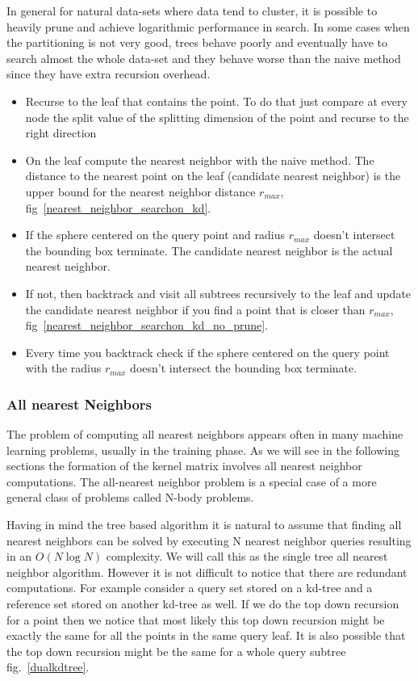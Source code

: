 \documentclass[12pt,letterpaper,doublespaced,ETD,dvips,proposal]{gtthesis}
\begin{document}
\begin{Body}
 In general for natural data-sets where data tend to cluster, it is
 possible to heavily prune and achieve logarithmic performance in
 search. In some cases when the partitioning is not very good, trees
 behave poorly and eventually have to search almost the whole
 data-set and they behave worse than the naive method since they
 have extra recursion overhead.

\begin{itemize}
   \item Recurse to the leaf that contains the point. To do that
   just compare at every node the split value of the splitting
   dimension of the point and recurse to the right direction
   \item On the leaf compute the nearest neighbor with the naive
   method. The distance to the nearest point on the leaf (candidate nearest neighbor)
   is the upper bound for the nearest neighbor distance $r_{max}$,
   fig~\ref{nearest_neighbor_searchon_kd}.
   \item If the sphere centered on the query point and radius
   $r_{max}$ doesn't intersect the bounding box terminate. The
   candidate nearest neighbor is the actual nearest neighbor.
   \item If not, then backtrack and visit all subtrees recursively
   to the leaf and update the candidate nearest neighbor if you find
   a point that is closer than $r_{max}$, fig~\ref{nearest_neighbor_searchon_kd_no_prune}.
   \item Every time you backtrack check if the sphere centered on
   the query point with the radius $r_{max}$ doesn't intersect the
   bounding box terminate.
 \end{itemize}


\subsubsection{All nearest Neighbors}
The problem of computing all nearest neighbors appears often in many
machine learning problems, usually in the training phase. As we will
see in the following sections the formation of the kernel matrix
involves all nearest neighbor computations. The all-nearest neighbor
problem is a special case of a more general class of problems called
N-body problems.

Having in mind the tree based algorithm it is natural to assume that
finding all nearest neighbors can be solved by executing N nearest
neighbor queries resulting in an $O(N\log N)$ complexity. We will
call this as the single tree all nearest neighbor algorithm. However
it is not difficult to notice that there are redundant computations.
For example consider  a query set stored on a kd-tree and a
reference set stored on another kd-tree as well. If we do the top
down recursion for a point then we notice that most likely this top
down recursion might be exactly the same for all the points in the
same query leaf. It is also possible that the top down recursion
might be the same for a whole query subtree fig.~\ref{dualkdtree}.


\end{Body}
\end{document}
